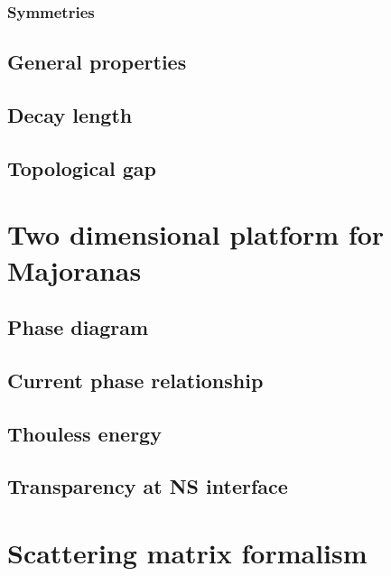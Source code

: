 		\subsubsection{Symmetries}

	\subsection{General properties}
	\subsection{Decay length}
	\subsection{Topological gap}


\section{Two dimensional platform for Majoranas}
	\subsection{Phase diagram}
	\subsection{Current phase relationship}
	\subsection{Thouless energy}
	\subsection{Transparency at NS interface}

\section{Scattering matrix formalism}

